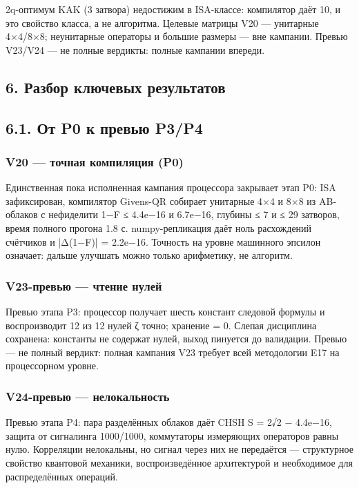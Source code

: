 \documentclass[11pt,a4paper]{article}
\begin{document}
2q-оптимум KAK (3 затвора) недостижим в ISA-классе: компилятор даёт 10, и это свойство класса, а не алгоритма. Целевые матрицы V20 — унитарные 4×4/8×8; неунитарные операторы и большие размеры — вне кампании. Превью V23/V24 — не полные вердикты: полные кампании впереди.

\subsection{6. Разбор ключевых результатов}

\subsection{6.1. От P0 к превью P3/P4}

\subsubsection{V20 — точная компиляция (P0)}

Единственная пока исполненная кампания процессора закрывает этап P0: ISA зафиксирован, компилятор Givens-QR собирает унитарные 4×4 и 8×8 из AB-облаков с нефиделити 1−F ≤ 4.4e−16 и 6.7e−16, глубины ≤ 7 и ≤ 29 затворов, время полного прогона 1.8 с. numpy-репликация даёт ноль расхождений счётчиков и |Δ(1−F)| = 2.2e−16. Точность на уровне машинного эпсилон означает: дальше улучшать можно только арифметику, не алгоритм.

\subsubsection{V23-превью — чтение нулей}

Превью этапа P3: процессор получает шесть констант следовой формулы и воспроизводит 12 из 12 нулей ζ точно; хранение = 0. Слепая дисциплина сохранена: константы не содержат нулей, выход пинуется до валидации. Превью — не полный вердикт: полная кампания V23 требует всей методологии E17 на процессорном уровне.

\subsubsection{V24-превью — нелокальность}

Превью этапа P4: пара разделённых облаков даёт CHSH S = 2√2 − 4.4e−16, защита от сигналинга 1000/1000, коммутаторы измеряющих операторов равны нулю. Корреляции нелокальны, но сигнал через них не передаётся — структурное свойство квантовой механики, воспроизведённое архитектурой и необходимое для распределённых операций.
\end{document}
